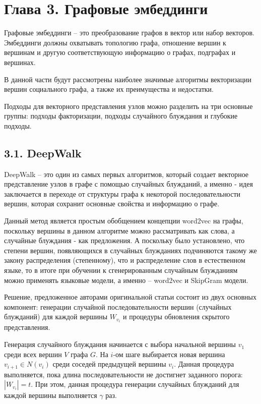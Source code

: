 \section{Глава 3. Графовые эмбеддинги}
Графовые эмбеддинги -- это преобразование графов в вектор или набор векторов. Эмбеддинги должны охватывать топологию графа, отношение вершин к вершинам и другую соответствующую информацию о графах, подграфах и вершинах.

В данной части будут рассмотрены наиболее значимые алгоритмы векторизации вершин социального графа, а также их преимущества и недостатки.

Подходы для векторного представления узлов можно разделить на три основные группы: подходы факторизации, подходы случайного блуждания и глубокие подходы.

\subsection{3.1. DeepWalk}

DeepWalk \cite{DeepWalk} -- это один из самых первых алгоритмов, который создает векторное представление узлов в графе с помощью случайных блужданий, а именно - идея заключается в переходе от структуры графа к некоторой последовательности вершин, которая сохранит основные свойства и информацию о графе. 

Данный метод является простым обобщением концепции word2vec \cite{word2vec} на графы, поскольку вершины в данном алгоритме можно рассматривать как слова, а случайные блуждания - как предложения. А поскольку было установлено, что степени вершин, появляющихся в случайных блужданиях подчиняются такому же закону распределения (степенному), что и распределение слов в естественном языке, то в итоге при обучении к сгенерированным случайным блужданиям можно применять языковые модели, а именно -- word2vec и SkipGram модели.  


Решение, предложенное авторами оригинальной статьи состоит
из двух основных компонент: генерации случайной последовательности вершин (случайных блужданий) для каждой вершины $W_{v_i}$ и процедуры обновления скрытого представления.

Генерация случайного блуждания начинается с выбора начальной
вершины $v_1$ среди всех вершин $V$ графа $G$.  На $i$-ом шаге выбирается новая вершина $v_{i+1} \in N(v_i)$ среди соседей предыдущей вершины $v_i$. Данная процедура выполняется, пока длина последовательности
не достигнет заданного порога: $|W_{v_i}| = t$. При этом, данная процедура генерации случайных блужданий для каждой вершины выполняется $\gamma$ раз.

